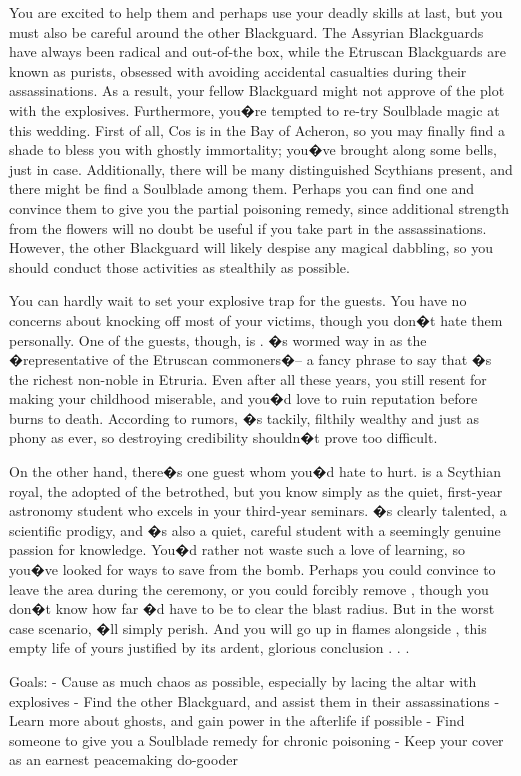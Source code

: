 \documentclass[char]{Kos}
\begin{document}
You are excited to help them and perhaps use your deadly skills at last, but you must also be careful around the other Blackguard. The Assyrian Blackguards have always been radical and out-of-the box, while the Etruscan Blackguards are known as purists, obsessed with avoiding accidental casualties during their assassinations. As a result, your fellow Blackguard might not approve of the plot with the explosives. Furthermore, you�re tempted to re-try Soulblade magic at this wedding. First of all, Cos is in the Bay of Acheron, so you may finally find a shade to bless you with ghostly immortality; you�ve brought along some bells, just in case. Additionally, there will be many distinguished Scythians present, and there might be find a Soulblade among them. Perhaps you can find one and convince them to give you the partial poisoning remedy, since additional strength from the flowers will no doubt be useful if you take part in the assassinations. However, the other Blackguard will likely despise any magical dabbling, so you should conduct those activities as stealthily as possible.

You can hardly wait to set your explosive trap for the guests. You have no concerns about knocking off most of your victims, though you don�t hate them personally. One of the guests, though, is \cMerchant{\nickname}. \cMerchant{\They}�s wormed \cMerchant{\their} way in as the �representative of the Etruscan commoners�-- a fancy phrase to say that \cMerchant{\they}�s the richest non-noble in Etruria. Even after all these years, you still resent \cMerchant{\them} for making your childhood miserable, and you�d love to ruin \cMerchant{\their} reputation before \cMerchant{\they} burns to death. According to rumors, \cMerchant{\they}�s tackily, filthily wealthy and just as phony as ever, so destroying \cMerchant{\their} credibility shouldn�t prove too difficult.

On the other hand, there�s one guest whom you�d hate to hurt. \cWard{\nickname} is a Scythian royal, the adopted \cWard{\sibling} of the betrothed, but you know \cWard{\them} simply as the quiet, first-year astronomy student who excels in your third-year seminars. \cWard{\They}�s clearly talented, a scientific prodigy, and \cWard{\they}�s also a quiet, careful student with a seemingly genuine passion for knowledge. You�d rather not waste such a love of learning, so you�ve looked for ways to save \cWard{\them} from the bomb. Perhaps you could convince \cWard{\them} to leave the area during the ceremony, or you could forcibly remove \cWard{\them}, though you don�t know how far \cWard{\they}�d have to be to clear the blast radius. But in the worst case scenario, \cWard{\they}�ll simply perish. And you will go up in flames alongside \cWard{\them}, this empty life of yours justified by its ardent, glorious conclusion . . .

Goals:
- Cause as much chaos as possible, especially by lacing the altar with explosives
- Find the other Blackguard, and assist them in their assassinations
- Learn more about ghosts, and gain power in the afterlife if possible
- Find someone to give you a Soulblade remedy for chronic poisoning
- Keep your cover as an earnest peacemaking do-gooder
\end{document}

